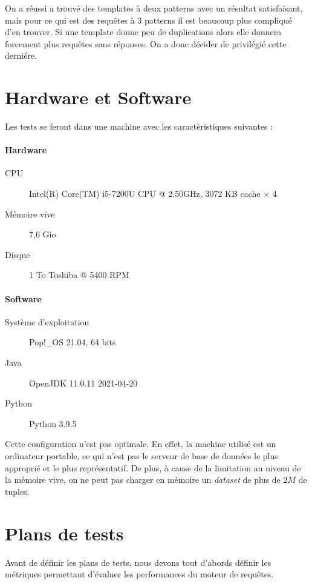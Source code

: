 \documentclass[12pt,titlepage]{article}
\begin{document}
On a réussi a trouvé des templates à deux patterns avec un résultat satisfaisant, mais pour ce qui est des requêtes à 3 patterns il est beaucoup plus compliqué d'en trouver. Si une template donne peu de duplications alors elle donnera forcement plus requêtes sans réponses. On a donc décider de privilégié cette derniére.

\section{Hardware et Software}

Les tests se feront dans une machine avec les caractèristiques suivantes :

\paragraph{Hardware}

\begin{description}
  \item[CPU] Intel(R) Core(TM) i5-7200U CPU @ 2.50GHz, 3072 KB cache $\times$ 4
  \item[Mémoire vive] 7,6 Gio
  \item[Disque] 1 To Toshiba @ 5400 RPM
\end{description}

\paragraph{Software}

\begin{description}
  \item[Système d'exploitation] Pop!\_OS 21.04, 64 bits
  \item[Java] OpenJDK 11.0.11 2021-04-20
  \item[Python] Python 3.9.5
\end{description}

Cette configuration n'est pas optimale. En effet, la machine utilisé est un ordinateur portable, ce qui n'est pas le serveur de base de données le plus approprié et le plus représentatif. De plus, à cause de la limitation au niveau de la mémoire vive, on ne peut pas charger en mémoire un \textit{dataset} de plus de $2M$ de tuples.

\section{Plans de tests}

Avant de définir les plans de tests, nous devons tout d'abords définir les métriques permettant d’évaluer les performances du moteur de requêtes.
\end{document}
